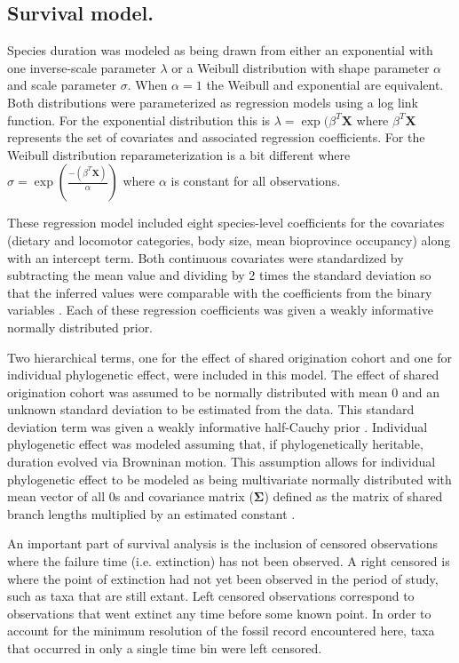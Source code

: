 \documentclass{nature}
\begin{document}
\begin{methods}
  \subsection{Survival model.}

  Species duration was modeled as being drawn from either an exponential with one inverse-scale parameter \(\lambda\) or a Weibull distribution with shape parameter \(\alpha\) and scale parameter \(\sigma\). When \(\alpha = 1\) the Weibull and exponential are equivalent. Both distributions were parameterized as regression models using a log link function. For the exponential distribution this is \(\lambda = \exp(\beta^{T}\mathbf{X}\) where \(\beta^{T}\mathbf{X}\) represents the set of covariates and associated regression coefficients. For the Weibull distribution reparameterization is a bit different where \(\sigma = \exp(\frac{-(\beta^{T}\mathbf{X})}{\alpha})\) where \(\alpha\) is constant for all observations.
  
  These regression model included eight species-level coefficients for the covariates (dietary and locomotor categories, body size, mean bioprovince occupancy) along with an intercept term. Both continuous covariates were standardized by subtracting the mean value and dividing by 2 times the standard deviation so that the inferred values were comparable with the coefficients from the binary variables \cite{Gelman2007}. Each of these regression coefficients was given a weakly informative normally distributed prior.

  Two hierarchical terms, one for the effect of shared origination cohort and one for individual phylogenetic effect, were included in this model. The effect of shared origination cohort was assumed to be normally distributed with mean 0 and an unknown standard deviation to be estimated from the data. This standard deviation term was given a weakly informative half-Cauchy prior \cite{Gelman2013d}. Individual phylogenetic effect was modeled assuming that, if phylogenetically heritable, duration evolved via Browninan motion. This assumption allows for individual phylogenetic effect to be modeled as being multivariate normally distributed with mean vector of all 0s and covariance matrix (\(\mathbf{\Sigma}\)) defined as the matrix of shared branch lengths multiplied by an estimated constant \cite{Lynch1991,Housworth2004}.

  An important part of survival analysis is the inclusion of censored observations where the failure time (i.e. extinction) has not been observed. A right censored is where the point of extinction had not yet been observed in the period of study, such as taxa that are still extant. Left censored observations correspond to observations that went extinct any time before some known point. In order to account for the minimum resolution of the fossil record encountered here, taxa that occurred in only a single time bin were left censored.


\end{methods}
\end{document}
